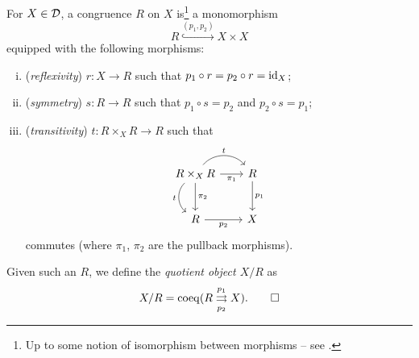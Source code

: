 

        \begin{definition}
            For $X\in\mathcal{D}$, a congruence $R$ on $X$ is\footnote{
                Up to some notion of isomorphism between morphisms -- see \cite{Anonymous:_jtXUz4d}.
            } a monomorphism
            \begin{equation*}
                R\overset{(p_1,p_2)}{\hookrightarrow} X\times X
            \end{equation*}
            equipped with the following morphisms:
            \begin{enumerate}[(i)]
                \item (\emph{reflexivity}) $r\colon X\to R$ such that $p_1\circ r=p_2\circ r=\operatorname{id}_X$;
                \item (\emph{symmetry}) $s\colon R\to R$ such that $p_1\circ s=p_2$ and $p_2\circ s=p_1$;
                \item (\emph{transitivity}) $t\colon R\times_X R\to R$ such that
                    \begin{equation*}
                        \begin{tikzcd}[column sep=2em, row sep=2.5em]
                            R\times_X R \arrow[r, swap, "\pi_1"] \arrow[r, bend left=50, "t"] \arrow[d, "\pi_2"] \arrow[d, bend right=50, swap, "t"] & R \arrow[d, "p_1"]\\
                            R \arrow[r, swap, "p_2"] & X
                        \end{tikzcd}
                    \end{equation*}
                    commutes (where $\pi_1$, $\pi_2$ are the pullback morphisms).
            \end{enumerate}
            Given such an $R$, we define the \emph{quotient object $X/R$} as
            \begin{equation*}
                X/R=\operatorname{coeq}(R\overset{p_1}{\underset{p_2}{\rightrightarrows}} X).\qedhere
            \end{equation*}
        \end{definition}


